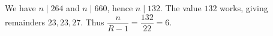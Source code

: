 We have $n\mid264$ and $n\mid660$, hence $n\mid132$. The value $132$ works, giving remainders $23,23,27$. Thus $\boxed{\dfrac{n}{R-1}=\dfrac{132}{22}=6}$.
